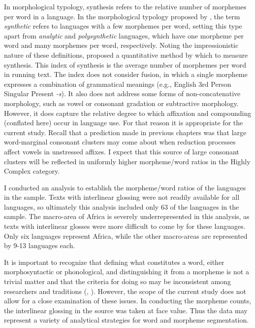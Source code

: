   In morphological typology, synthesis refers to the relative number of morphemes per word in a language. In the morphological typology proposed by \citet{Sapir1921}, the term \textit{synthetic} refers to languages with a few morphemes per word, setting this type apart from \textit{analytic} and \textit{polysynthetic} languages, which have one morpheme per word and many morphemes per word, respectively. Noting the impressionistic nature of these definitions, \citet{Greenberg1954} proposed a quantitative method by which to measure synthesis. This index of synthesis is the average number of morphemes per word in running text. The index does not consider fusion, in which a single morpheme expresses a combination of grammatical meanings (e.g., English 3rd Person Singular Present \textit{{}-s}). It also does not address some forms of non-concatenative morphology, such as vowel or consonant gradation or subtractive morphology. However, it does capture the relative degree to which affixation and compounding (conflated here) occur in language use. For that reason it is appropriate for the current study. Recall that a prediction made in previous chapters was that large word-marginal consonant clusters may come about when reduction processes affect vowels in unstressed affixes. I expect that this source of large consonant clusters will be reflected in uniformly higher morpheme/word ratios in the Highly Complex category.



  I conducted an analysis to establish the morpheme/word ratios of the languages in the sample. Texts with interlinear glossing were not readily available for all languages, so ultimately this analysis included only 63 of the languages in the sample. The macro-area of Africa is severely underrepresented in this analysis, as texts with interlinear glosses were more difficult to come by for these languages. Only six languages represent Africa, while the other macro-areas are represented by 9-13 languages each.



  It is important to recognize that defining what constitutes a word, either morphosyntactic or phonological, and distinguishing it from a morpheme is not a trivial matter and that the criteria for doing so may be inconsistent among researchers and traditions (\citealt{Haspelmath2011}, \citealt{SchieringEtAl2010}). However, the scope of the current study does not allow for a close examination of these issues. In conducting the morpheme counts, the interlinear glossing in the source was taken at face value. Thus the data may represent a variety of analytical strategies for word and morpheme segmentation. 



